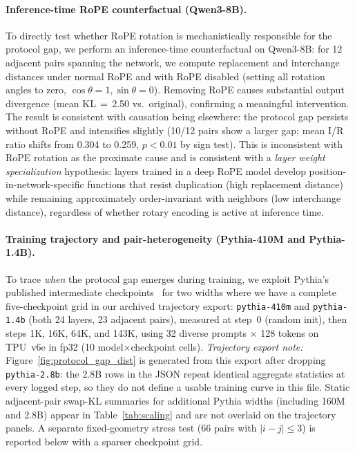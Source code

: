 \documentclass{article}
\begin{document}
\paragraph{Inference-time RoPE counterfactual (Qwen3-8B).}
To directly test whether RoPE rotation is mechanistically responsible for the protocol gap, we perform an inference-time counterfactual on Qwen3-8B: for 12 adjacent pairs spanning the network, we compute replacement and interchange distances under normal RoPE and with RoPE disabled (setting all rotation angles to zero, $\cos\theta{=}1, \sin\theta{=}0$). Removing RoPE causes substantial output divergence (mean KL\,$=$\,2.50 vs.\ original), confirming a meaningful intervention. The result is consistent with causation being elsewhere: the protocol gap persists without RoPE and intensifies slightly (10/12 pairs show a larger gap; mean I/R ratio shifts from 0.304 to 0.259, $p < 0.01$ by sign test). This is inconsistent with RoPE rotation as the proximate cause and is consistent with a \emph{layer weight specialization} hypothesis: layers trained in a deep RoPE model develop position-in-network-specific functions that resist duplication (high replacement distance) while remaining approximately order-invariant with neighbors (low interchange distance), regardless of whether rotary encoding is active at inference time.

\paragraph{Training trajectory and pair-heterogeneity (Pythia-410M and Pythia-1.4B).}
To trace \emph{when} the protocol gap emerges during training, we exploit Pythia's published intermediate checkpoints~\citep{biderman2023pythia} for two widths where we have a complete five-checkpoint grid in our archived trajectory export: \texttt{pythia-410m} and \texttt{pythia-1.4b} (both 24 layers, 23 adjacent pairs), measured at step~0 (random init), then steps 1K, 16K, 64K, and 143K, using 32 diverse prompts $\times$ 128 tokens on TPU~v6e in fp32 (10 model$\times$checkpoint cells).
\textit{Trajectory export note:} Figure~\ref{fig:protocol_gap_dist} is generated from this export after dropping \texttt{pythia-2.8b}: the 2.8B rows in the JSON repeat identical aggregate statistics at every logged step, so they do not define a usable training curve in this file. Static adjacent-pair swap-KL summaries for additional Pythia widths (including 160M and 2.8B) appear in Table~\ref{tab:scaling} and are not overlaid on the trajectory panels. A separate fixed-geometry stress test (66 pairs with $|i{-}j|{\leq}3$) is reported below with a sparser checkpoint grid.
\end{document}
